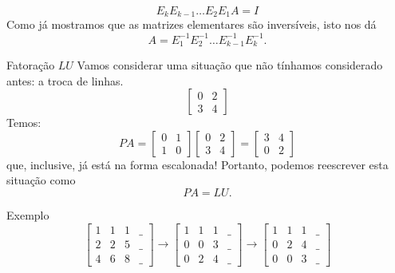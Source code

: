 \documentclass{beamer}
\begin{document}
\begin{darkframes}
\begin{frame}{}
{\begin{itemize}
  $$E_kE_{k-1}\ldots E_2E_1 A = I$$
  Como já mostramos que as matrizes elementares são inversíveis, isto nos dá
  $$A = E_1^{-1}E_2^{-1}\ldots E_{k-1}^{-1}E_k^{-1}.$$\end{itemize}}
\end{frame}

\begin{frame}{Fatoração $LU$}
 Vamos considerar uma situação que não tínhamos considerado antes: a troca de linhas.
	\begin{equation*}
	   \begin{bmatrix}
	      0 & 2\\
	      3 & 4
	   \end{bmatrix}
	\end{equation*}
Temos:
\begin{equation*}
	   PA = \begin{bmatrix} 0 & 1\\1& 0 \end{bmatrix} \begin{bmatrix} 0 & 2\\3 &
4 \end{bmatrix} = \begin{bmatrix} 3 & 4\\ 0 & 2\end{bmatrix}
	\end{equation*}
	que, inclusive, já está na forma escalonada! Portanto, podemos reescrever esta situação como
	\begin{equation*} 
		PA = LU.
	\end{equation*}
\end{frame}

\begin{frame}{Exemplo}
	\begin{equation*}
  \begin{bmatrix}
      1 & 1 & 1 & \_ \\
      2 & 2 & 5 & \_ \\
      4 & 6 & 8 & \_
  \end{bmatrix}
  \rightarrow 
  \begin{bmatrix}
      1 & 1 & 1 & \_ \\
      0 & 0 & 3 & \_ \\
      0 & 2 & 4 & \_
  \end{bmatrix}
  \rightarrow 
  \begin{bmatrix}
      1 & 1 & 1 & \_ \\
      0 & 2 & 4 & \_ \\
      0 & 0 & 3 & \_ 
  \end{bmatrix}
	\end{equation*}
\end{frame}


\end{darkframes}
\end{document}
